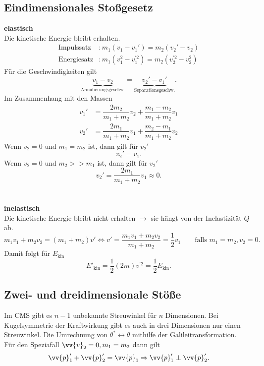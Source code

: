 \documentclass[a4paper,12pt]{article}
\begin{document}
\subsection{Eindimensionales Stoßgesetz}
\textbf{elastisch}\\
Die kinetische Energie bleibt erhalten.
\begin{align*}
        \text{Impulssatz}&:m_1\left(v_1-v_1'\right)=m_2\left(v_2'-v_2\right)\\
        \text{Energiesatz}&:m_1\left(v_1^2-v_1^{'2}\right)=m_2\left(v_2^{'2}-v_2^2\right)
\end{align*}
Für die Geschwindigkeiten gilt
\[ 
        \underbrace{v_1-v_2}_{\text{Annäherungsgeschw.}}=\underbrace{v_2'-v_1'}_{\text{Separationsgeschw.}}
.\] 
Im Zusammenhang mit den Massen
\begin{align*}
        v_1'&=\dfrac{2m_2}{m_1+m_2}v_2+\dfrac{m_1-m_2}{m_1+m_2}v_1\\
        v_2'&=\dfrac{2m_1}{m_1+m_2}v_1+\dfrac{m_2-m_1}{m_1+m_2}v_2
\end{align*}
Wenn $v_2=0\text{ und }m_1=m_2$ ist, dann gilt für $v_2'$ 
\[ 
        v_2'=v_1
.\] 
Wenn $v_2=0\text{ und }m_2>>m_1$ ist, dann gilt für $v_2'$ 
\[ 
        v_2'=\dfrac{2m_1}{m_1+m_2}v_1\approx 0
.\] 
\\\hfill\\\textbf{inelastisch}\\ 
Die kinetische Energie bleibt nicht erhalten $\rightarrow $ sie hängt von der Inelastizität $Q$ ab. 
\[ 
        m_1v_1+m_2v_2=\left(m_1+m_2\right)v'\Leftrightarrow v'=\dfrac{m_1v_1+m_2v_2}{m_1+m_2}=\dfrac{1}{2}v_1\qquad \text{falls }m_1=m_2,v_2=0
.\] 
Damit folgt für $E_{\text{kin}}$ 
\[ 
        E'_{\text{kin}}=\dfrac{1}{2}\left(2m\right)v^{'2}=\dfrac{1}{2}E_{\text{kin}}
.\] 

\subsection{Zwei- und dreidimensionale Stöße}
Im CMS gibt es $n-1$ unbekannte Streuwinkel für $n$ Dimensionen. Bei Kugelsymmetrie der Kraftwirkung gibt es auch in drei Dimensionen nur einen Streuwinkel. Die Umrechnung von $\theta ^{*}\leftrightarrow \theta $ mithilfe der Galileitransformation.\\Für den Speziafall $\vv{v}_2=0,m_1=m_2$ dann gilt
\[ 
        \vv{p}_1'+\vv{p}_2'=\vv{p}_1\Rightarrow \vv{p}_1'\perp\vv{p}_2'
.\] 
\end{document}

